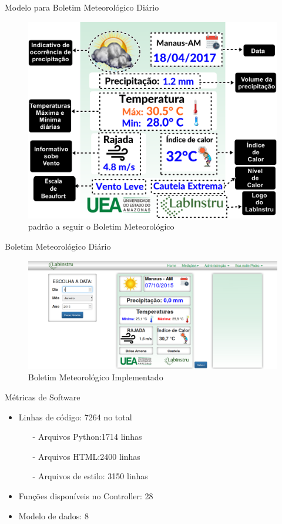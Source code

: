\begin{frame}{Modelo para Boletim Meteorológico Diário}
\begin{figure}[h!]
\centering
\includegraphics[width=0.5\linewidth]{./img/esbocoBoletim}
\caption{padrão a seguir o Boletim Meteorológico} \label{fig:modeloBoletim}
\end{figure}
\end{frame}

\begin{frame}{Boletim Meteorológico Diário}
\begin{figure}[h!]
\centering
\includegraphics[width=0.7\linewidth]{./img/boletim}
\caption{Boletim Meteorológico Implementado} \label{fig:boletim}
\end{figure}
\end{frame}

\begin{frame}{Métricas de Software}
\begin{itemize}
\item Linhas de código: 7264 no total
\begin{itemize}
\item[-] Arquivos Python:1714 linhas
\ \ \newline
\item[-] Arquivos HTML:2400 linhas
\ \ \newline
\item[-] Arquivos de estilo: 3150 linhas
\end{itemize}
\item Funções disponíveis no Controller: 28
\ \ \newline
\item Modelo de dados: 8
\end{itemize}
\end{frame}
